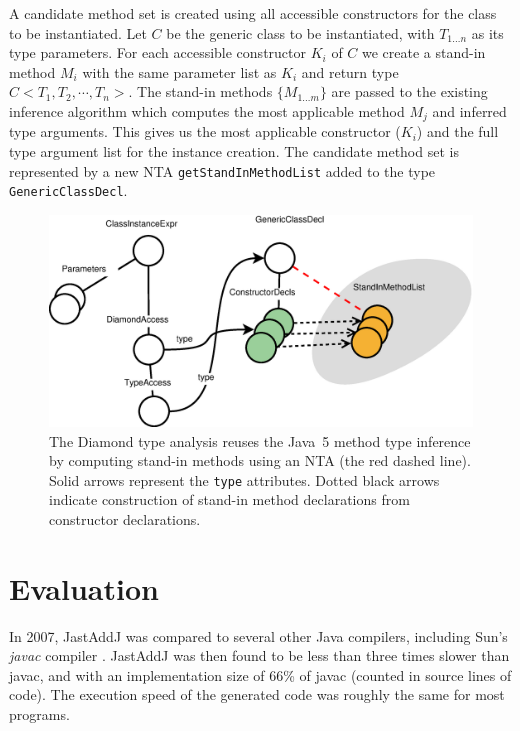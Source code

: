 {A candidate method set is created using all accessible
constructors for the class to be instantiated. Let $C$ be the generic class to
be instantiated, with $T_{1 \ldots n}$ as its type parameters. For each
accessible constructor $K_i$ of $C$ we create a stand-in method $M_i$ with the
same parameter list as $K_i$ and return type $C<T_1, T_2, \cdots, T_n>$. The
stand-in methods $\{M_{1 \ldots m}\}$ are passed to the existing
inference algorithm which computes the most applicable method $M_j$ and
inferred type arguments. This gives us the most applicable constructor ($K_i$)
and the full type argument list for the instance creation. The candidate method
set is represented by a new NTA \verb'getStandInMethodList' added to the type
\verb'GenericClassDecl'.


\begin{figure}
	\centering
	\includegraphics[width=\columnwidth]{figures/Diamond.eps}
	\caption{The Diamond type analysis reuses the Java~5 method type inference by computing stand-in methods using an NTA (the red dashed line). Solid arrows represent the \texttt{type} attributes. Dotted black arrows indicate construction of stand-in method declarations from constructor declarations.}
	\label{fig:diamond}
\end{figure}



\section{Evaluation}
\label{sec:evaluation}

In 2007, JastAddJ was compared to several other Java  compilers, including
Sun's \emph{javac} compiler \cite{jastaddj}. JastAddJ was then found to be less
than three times slower than javac, and with an implementation size of 66\% of
javac (counted in source lines of code). The execution speed of the generated
code was roughly the same for most programs.

}
